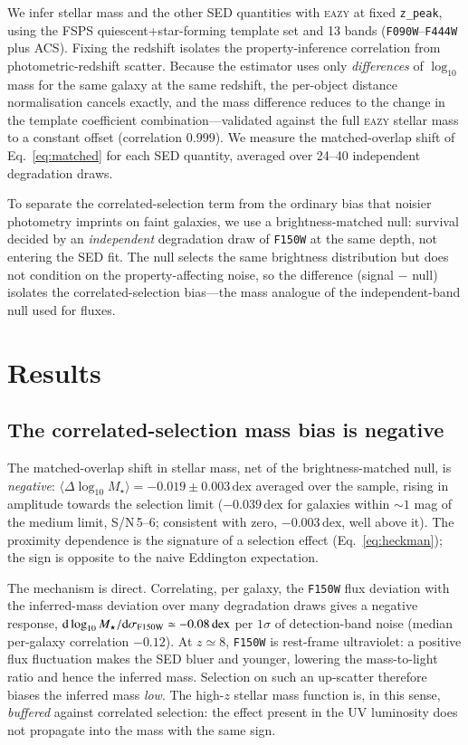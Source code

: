 \documentclass{aa}
\newcommand{\Mst}{M_\star}
\newcommand{\dex}{\,\mathrm{dex}}
\begin{document}
We infer stellar mass and the other SED quantities with \textsc{eazy} \citep{Brammer2008} at fixed
\texttt{z\_peak}, using the FSPS \citep{Conroy2009} quiescent+star-forming template set and 13
bands (\texttt{F090W}--\texttt{F444W} plus ACS). Fixing the redshift isolates the property-inference
correlation from photometric-redshift scatter. Because the estimator uses only \emph{differences}
of $\log_{10}$ mass for the same galaxy at the same redshift, the per-object distance
normalisation cancels exactly, and the mass difference reduces to the change in the template
coefficient combination---validated against the full \textsc{eazy} stellar mass to a constant
offset (correlation $0.999$). We measure the matched-overlap shift of Eq.~\eqref{eq:matched} for
each SED quantity, averaged over 24--40 independent degradation draws.

To separate the correlated-selection term from the ordinary bias that noisier photometry imprints
on faint galaxies, we use a brightness-matched null: survival decided by an \emph{independent}
degradation draw of \texttt{F150W} at the same depth, not entering the SED fit. The null selects
the same brightness distribution but does not condition on the property-affecting noise, so the
difference (signal $-$ null) isolates the correlated-selection bias---the mass analogue of the
independent-band null used for fluxes.

\section{Results}
\label{sec:results}

\subsection{The correlated-selection mass bias is negative}
\label{sec:mass}

The matched-overlap shift in stellar mass, net of the brightness-matched null, is
\emph{negative}: $\langle\Delta\log_{10}\Mst\rangle=-0.019\pm0.003\dex$ averaged over the sample,
rising in amplitude towards the selection limit ($-0.039\dex$ for galaxies within $\sim\!1$ mag
of the medium limit, S/N$\,$5--6; consistent with zero, $-0.003\dex$, well above it). The
proximity dependence is the signature of a selection effect (Eq.~\ref{eq:heckman}); the sign is
opposite to the naive Eddington expectation.

The mechanism is direct. Correlating, per galaxy, the \texttt{F150W} flux deviation with the
inferred-mass deviation over many degradation draws gives a negative response,
$\mathrm{d}\log_{10}\Mst/\mathrm{d}\sigma_{\rm F150W}\simeq-0.08\dex$ per $1\sigma$ of
detection-band noise (median per-galaxy correlation $-0.12$). At $z\simeq8$, \texttt{F150W} is
rest-frame ultraviolet: a positive flux fluctuation makes the SED bluer and younger, lowering the
mass-to-light ratio and hence the inferred mass. Selection on such an up-scatter therefore biases
the inferred mass \emph{low}. The high-$z$ stellar mass function is, in this sense,
\emph{buffered} against correlated selection: the effect present in the UV luminosity does not
propagate into the mass with the same sign.
\end{document}
